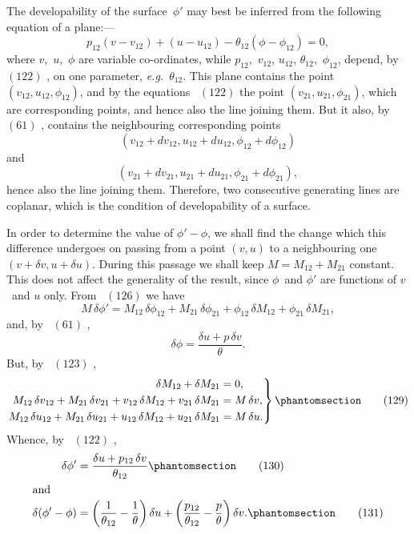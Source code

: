 \documentclass[12pt]{book}[2005/09/16]
\newcommand{\Chg}[2]{#2}
\newcommand{\Add}[1]{\Chg{}{#1}}
\newcommand{\Tag}[1]{%
  \phantomsection\label{eqn:#1}\tag*{\ensuremath{#1}}%
}
\newcommand{\Eq}[1]{%
  \hyperref[eqn:#1]{\ensuremath{#1}}%
}
\newcommand{\PageSep}[1]{\ignorespaces}
\newcommand{\eg}{\emph{e.g.}}
\begin{document}
The developability of the surface~$\phi'$ may best be inferred
from the following equation of a plane:---
\[
p_{12} (v - v_{12}) + (u - u_{12}) - \theta_{12} (\phi - \phi_{12}) = 0,
\]
\PageSep{165}
where $v$,~$u$,~$\phi$ are variable co-ordinates, while $p_{12}$,~$v_{12}$,
$u_{12}$, $\theta_{12}$,~$\phi_{12}$, depend, by~\Eq{(122)}, on one parameter, \eg~$\theta_{12}$.
This plane contains the point $(v_{12}, u_{12}, \phi_{12})$, and by the
equations~\Eq{(122)} the point $(v_{21}, u_{21}, \phi_{21})$, which are corresponding
points, and hence also the line joining them.
But it also, by~\Eq{(61)}, contains the neighbouring corresponding
points
\[
(v_{12} + dv_{12}, u_{12} + du_{12}, \phi_{12} + d\phi_{12})
\]
and
\[
(v_{21} + dv_{21}, u_{21} + du_{21}, \phi_{21} + d\phi_{21})\Add{,}
\]
hence also the line joining them. Therefore, two consecutive
generating lines are coplanar, which is the condition of
developability of a surface.

In order to determine the value of $\phi' - \phi$, we shall
find the change which this difference undergoes on passing
from a point $(v, u)$ to a neighbouring one $(v + \delta v, u + \delta u)$.
During this passage we shall keep $M = M_{12} + M_{21}$ constant.
This does not affect the generality of the result, since $\phi$~and
$\phi'$ are functions of $v$~and $u$ only. From~\Eq{(126)} we have
\[
M\, \delta \phi'
  = M_{12}\, \delta \phi_{12} + M_{21}\, \delta \phi_{21}
  + \phi_{12}\, \delta M_{12} + \phi_{21}\, \delta M_{21},
\]
and, by~\Eq{(61)},
\[
\delta \phi = \frac{\delta u + p\, \delta v}{\theta}.
\]
But, by~\Eq{(123)},
\[
\left.
\begin{aligned}
\delta M_{12} + \delta M_{21} &= 0\Add{,} \\
M_{12}\, \delta v_{12} + M_{21}\, \delta v_{21}
+ v_{12}\, \delta M_{12} + v_{21}\, \delta M_{21} &= M\, \delta v\Add{,} \\
M_{12}\, \delta u_{12} + M_{21}\, \delta u_{21}
+ u_{12}\, \delta M_{12} + u_{21}\, \delta M_{21} &= M\, \delta u\Add{.} \\
\end{aligned}
\right\}
\Tag{(129)}
\]
Whence, by~\Eq{(122)},
\begin{align*}
\delta \phi' &= \frac{\delta u + p_{12}\, \delta v}{\theta_{12}}
\Tag{(130)} \\
\intertext{and}
\delta (\phi' - \phi)
  &= \left(\frac{1}{\theta_{12}} - \frac{1}{\theta}\right) \delta u
   + \left(\frac{p_{12}}{\theta_{12}} - \frac{p}{\theta}\right) \delta v.
\Tag{(131)}
\end{align*}
\PageSep{166}
\end{document}

